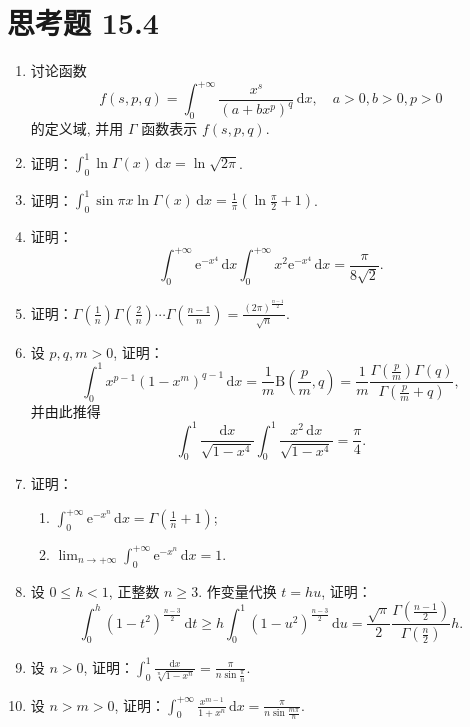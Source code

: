 \section*{思考题 15.4}
\begin{enumerate}
  \item 讨论函数
  \[
    f(s,p,q)=\int_{0}^{+\infty}\frac{x^{s}}{(a+bx^{p})^{q}}\,\mathrm{d}x,\quad a>0, b>0, p>0
\]
  的定义域, 并用 $\Gamma$ 函数表示 $f(s,p,q)$.
  \item 证明：$\displaystyle\int_{0}^{1}\ln\Gamma(x)\,\mathrm{d}x=\ln\sqrt{2\pi}$.
  \item 证明：$\displaystyle\int_{0}^{1}\sin\pi x\ln\Gamma(x)\,\mathrm{d}x=\frac{1}{\pi}\left(\ln\frac{\pi}{2}+1\right)$.
  \item 证明：
  \[
    \int_{0}^{+\infty}\mathrm{e}^{-x^{4}}\,\mathrm{d}x\int_{0}^{+\infty}x^{2}\mathrm{e}^{-x^{4}}\,\mathrm{d}x=\frac{\pi}{8\sqrt{2}}.
\]
  \item 证明：$\displaystyle\Gamma\left(\frac{1}{n}\right)\Gamma\left(\frac{2}{n}\right)\cdots\Gamma\left(\frac{n-1}{n}\right)=\frac{(2\pi)^{\frac{n-1}{2}}}{\sqrt{n}}$.
  \item 设 $p,q,m>0$, 证明：
  \[
    \int_{0}^{1}x^{p-1}(1-x^{m})^{q-1}\,\mathrm{d}x=\frac{1}{m}\mathrm{B}\left(\frac{p}{m},q\right)=\frac{1}{m}\frac{\Gamma\left(\frac{p}{m}\right)\Gamma(q)}{\Gamma\left(\frac{p}{m}+q\right)},
\]
  并由此推得
  \[
    \int_{0}^{1}\frac{\mathrm{d}x}{\sqrt{1-x^{4}}}\int_{0}^{1}\frac{x^{2}\,\mathrm{d}x}{\sqrt{1-x^{4}}}=\frac{\pi}{4}.
\]
  \item 证明：
  \begin{enumerate}
    \item $\displaystyle\int_{0}^{+\infty}\mathrm{e}^{-x^{n}}\,\mathrm{d}x=\Gamma\left(\frac{1}{n}+1\right)$;
    \item $\displaystyle\lim_{n\to+\infty}\int_{0}^{+\infty}\mathrm{e}^{-x^{n}}\,\mathrm{d}x=1$.
  \end{enumerate}
  \item 设 $0\leqslant h<1$, 正整数 $n\geqslant 3$. 作变量代换 $t=hu$, 证明：
  \[
    \int_{0}^{h}(1-t^{2})^{\frac{n-3}{2}}\,\mathrm{d}t\geqslant h\int_{0}^{1}(1-u^{2})^{\frac{n-3}{2}}\,\mathrm{d}u=\frac{\sqrt{\pi}}{2}\frac{\Gamma\left(\frac{n-1}{2}\right)}{\Gamma\left(\frac{n}{2}\right)}h.
\]
  \item 设 $n>0$, 证明：$\displaystyle\int_{0}^{1}\frac{\mathrm{d}x}{\sqrt[n]{1-x^{n}}}=\frac{\pi}{n\sin\frac{\pi}{n}}$.
  \item 设 $n>m>0$, 证明：$\displaystyle\int_{0}^{+\infty}\frac{x^{m-1}}{1+x^{n}}\,\mathrm{d}x=\frac{\pi}{n\sin\frac{m\pi}{n}}$.

\end{enumerate}
